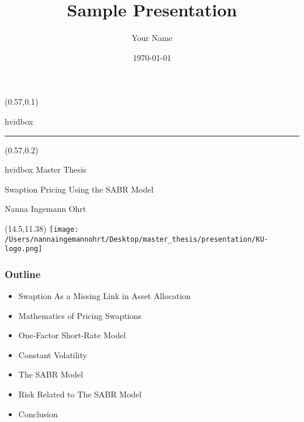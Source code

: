 \documentclass{beamer}
\title{Sample Presentation}
\author{Your Name}
\date{\today}
\begin{document}
{
\begin{frame}[plain] 
    \begin{textblock*}{\textwidth}(0.57\textwidth,0.1\textheight)
        \begin{beamercolorbox}[wd=7.8cm,ht=7.3cm,sep=0.5cm]{hvidbox}
            \fontsize{5}{10}\selectfont {}
            \noindent\textcolor{KUrod}{\rule{6.8cm}{0.4pt}}
        \end{beamercolorbox}
    \end{textblock*}
    \begin{textblock*}{\textwidth}(0.57\textwidth,0.2\textheight) 
        \begin{beamercolorbox}[wd=7.8cm,sep=0.5cm]{hvidbox}
                \Huge \textcolor{KUrod}{Master Thesis}
                \vspace{0.5cm}
                \par
                \Large Swaption Pricing Using the SABR Model
                \vspace{0.5cm}
                \par
                \normalsize Nanna Ingemann Ohrt
        \end{beamercolorbox}
    \end{textblock*}
    \begin{textblock}{1}(14.5,11.38)
        \texttt{[image: /Users/nannaingemannohrt/Desktop/master\_thesis/presentation/KU-logo.png]}
    \end{textblock}
\end{frame}
}

\begin{frame}
    \frametitle{{\textcolor{KUrod}{Outline}}}
    \begin{itemize}[label=\textcolor{KUrod}{\textbullet}]
        \item Swaption As a Missing Link in Asset Allocation
        \item Mathematics of Pricing Swaptions
        \item One-Factor Short-Rate Model
        \item Constant Volatility
        \item The SABR Model
        \item Risk Related to The SABR Model
        \item Conclusion
    \end{itemize}
\end{frame}
    
\end{document}
